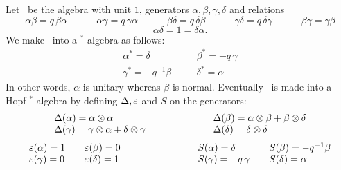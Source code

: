 Let \Aq\ be the algebra with unit $1$, generators $\alpha,\beta,\gamma,\delta$
and relations $$ \alpha\beta = q\,\beta\alpha     \hspace{3em}
   \alpha\gamma = q\,\gamma\alpha   \hspace{3em}
   \beta\delta = q\,\delta\beta     \hspace{3em}
   \gamma\delta = q\,\delta\gamma   \hspace{3em}
   \beta\gamma = \gamma\beta $$
$$   \alpha\delta = 1 = \delta\alpha.  $$
We make \Aq\ into a $^*$-algebra as follows:
$$ \begin{array}{lcl}
     \alpha^* = \delta   &\hspace{1em} & \beta^* = -q\,\gamma \\
     \gamma^* = -q^{-1} \beta  & & \delta^* = \alpha
   \end{array}$$
In other words, $\alpha$ is unitary whereas $\beta$ is normal.
Eventually \Aq\ is made into a Hopf $^*$-algebra by defining $\Delta, \varepsilon$ and $S$
on the generators:
$$ \begin{array}{lcl}
   \Delta(\alpha) = \alpha \otimes \alpha & \hspace{5em} &
                       \Delta(\beta) = \alpha \otimes \beta + \beta \otimes \delta  \\
   \Delta(\gamma) = \gamma \otimes \alpha + \delta \otimes \gamma & &
                       \Delta(\delta) = \delta \otimes \delta
\end{array} $$
$$ \begin{array}{lclclcl}
  \varepsilon(\alpha) = 1 & & \varepsilon(\beta) = 0  &\hspace{6em} &
                S(\alpha) = \delta  & &  S(\beta) = -q^{-1} \beta \\
  \varepsilon(\gamma) = 0 & & \varepsilon(\delta) = 1 & &
                S(\gamma) = -q\,\gamma & & S(\delta) = \alpha
\end{array}$$

